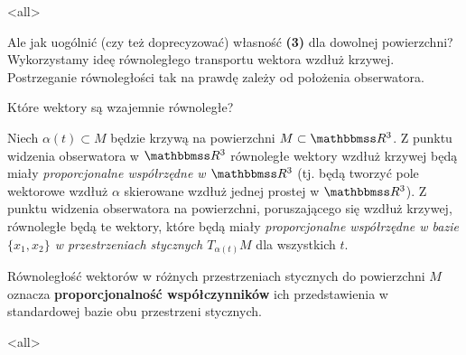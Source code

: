 \mode<all>{}

\begin{frame}[<+->]
Ale jak uogólnić (czy też doprecyzować) własność \textbf{(3)} dla dowolnej powierzchni? Wykorzystamy ideę równoległego transportu wektora wzdłuż krzywej. \pause Postrzeganie równoległości tak na prawdę zależy od położenia obserwatora. 
\begin{center}

\bigskip Które wektory są wzajemnie równoległe?
\end{center}

\end{frame}

Niech $\alpha(t)\subset M$ będzie krzywą na powierzchni $M\subset \R^3$. Z 
punktu widzenia obserwatora w $\R^3$ równoległe wektory wzdłuż krzywej będą 
miały \textit{proporcjonalne współrzędne w $\R^3$} (tj. będą tworzyć pole 
wektorowe wzdłuż $\alpha$ skierowane wzdłuż jednej prostej w $\R^3$). Z punktu 
widzenia obserwatora na powierzchni, poruszającego się wzdłuż krzywej, 
równoległe będą te wektory, które będą miały \textit{proporcjonalne współrzędne 
w bazie $\{x_1, x_2\}$ w przestrzeniach stycznych $T_{\alpha(t)}M$} dla 
wszystkich $t$.

\begin{frame}[<+->]
\begin{uwaga}
Równoległość wektorów w różnych przestrzeniach stycznych do powierzchni $M$ oznacza \textbf{proporcjonalność współczynników} ich przedstawienia w standardowej bazie obu przestrzeni stycznych.
\end{uwaga}




\end{frame}
\mode<all>{}

